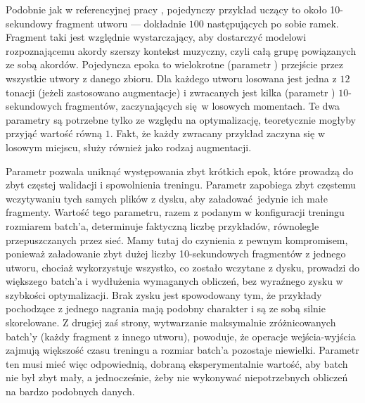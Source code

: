 Podobnie jak w referencyjnej pracy \cite{park_bi-directional_2019}, pojedynczy przykład uczący to około 10-sekundowy fragment utworu --- dokładnie $100$ następujących po sobie ramek. Fragment taki jest względnie wystarczający, aby dostarczyć modelowi rozpoznającemu akordy szerszy kontekst muzyczny, czyli całą grupę powiązanych ze sobą akordów. Pojedyncza epoka to wielokrotne (parametr ) przejście przez wszystkie utwory z danego zbioru. Dla każdego utworu losowana jest jedna z $12$ tonacji (jeżeli zastosowano augmentacje) i zwracanych jest kilka (parametr ) $10$-sekundowych fragmentów, zaczynających się w losowych momentach. Te dwa parametry są potrzebne tylko ze względu na optymalizację, teoretycznie mogłyby przyjąć wartość równą $1$. Fakt, że każdy zwracany przykład zaczyna się w losowym miejscu, służy również jako rodzaj augmentacji.

Parametr  pozwala uniknąć występowania zbyt krótkich epok, które prowadzą do zbyt częstej walidacji i spowolnienia treningu. Parametr  zapobiega zbyt częstemu wczytywaniu tych samych plików z dysku, aby załadować jedynie ich małe fragmenty. Wartość tego parametru, razem z podanym w konfiguracji treningu rozmiarem batch'a, determinuje faktyczną liczbę przykładów, równolegle przepuszczanych przez sieć. Mamy tutaj do czynienia z pewnym kompromisem, ponieważ załadowanie zbyt dużej liczby 10-sekundowych fragmentów z jednego utworu, chociaż wykorzystuje wszystko, co zostało wczytane z dysku, prowadzi do większego batch'a i wydłużenia wymaganych obliczeń, bez wyraźnego zysku w szybkości optymalizacji. Brak zysku jest spowodowany tym, że przykłady pochodzące z jednego nagrania mają podobny charakter i są ze sobą silnie skorelowane. Z drugiej zaś strony, wytwarzanie maksymalnie zróżnicowanych batch'y (każdy fragment z innego utworu), powoduje, że operacje wejścia-wyjścia zajmują większość czasu treningu a rozmiar batch'a pozostaje niewielki.  Parametr ten musi mieć więc odpowiednią, dobraną eksperymentalnie wartość, aby batch nie był zbyt mały, a jednocześnie, żeby nie wykonywać niepotrzebnych obliczeń na bardzo podobnych danych.


